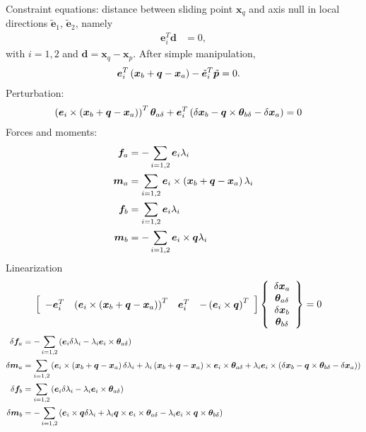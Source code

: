 \documentclass[10pt,fleqn,subeqn]{report}
\newcommand{\T}[1]{\bm{#1}}
\begin{document}
Constraint equations:
distance between sliding point $\T{x}_q$ and axis null in local directions
$\tilde{\T{e}}_1$, $\tilde{\T{e}}_2$, namely
\begin{align}
	\T{e}_i^T \T{d}
	&=
	0
	,
\end{align}
with $i=1,2$ and $\T{d} = \T{x}_q - \T{x}_p$.
After simple manipulation,
\begin{align}
	\T{e}_i^T \plbr{\T{x}_b + \T{q} - \T{x}_a} - \tilde{\T{e}}_i^T \tilde{\T{p}}
	&=
	0
	.
\end{align}
Perturbation:
\begin{align}
	\plbr{\T{e}_i \times \plbr{\T{x}_b + \T{q} - \T{x}_a}}^T \T{\theta}_{a\delta}
	+ \T{e}_i^T \plbr{
		\delta\T{x}_b
		-
		\T{q} \times \T{\theta}_{b\delta}
		-
		\delta\T{x}_a
	}
	&=
	0
\end{align}
Forces and moments:
\begin{subequations}
\begin{align}
	\T{f}_a
	&=
	- \sum_{i=1,2} \T{e}_i \lambda_i
	\\
	\T{m}_a
	&=
	\sum_{i=1,2} \T{e}_i \times \plbr{\T{x}_b + \T{q} - \T{x}_a} \lambda_i
	\\
	\T{f}_b
	&=
	\sum_{i=1,2} \T{e}_i \lambda_i
	\\
	\T{m}_b
	&=
	- \sum_{i=1,2} \T{e}_i \times \T{q} \lambda_i
\end{align}
\end{subequations}
Linearization
\begin{align}
	\sqbr{\matr{cccc}{
		-\T{e}_i^T
		&
		\plbr{\T{e}_i \times \plbr{\T{x}_b + \T{q} - \T{x}_a}}^T
		&
		\T{e}_i^T
		&
		-\plbr{\T{e}_i \times \T{q}}^T
	}} \cubr{\cvvect{
		\delta\T{x}_a
		\\
		\T{\theta}_{a\delta}
		\\
		\delta\T{x}_b
		\\
		\T{\theta}_{b\delta}
	}}
	&=
	0
\end{align}
\begin{subequations}
\begin{align}
	\delta\T{f}_a
	&=
	-\sum_{i=1,2} \plbr{
		\T{e}_i \delta\lambda_i
		-
		\lambda_i \T{e}_i \times \T{\theta}_{a\delta}
	}
	\\
	\delta\T{m}_a
	&=
	\sum_{i=1,2} \plbr{
		\T{e}_i \times \plbr{\T{x}_b + \T{q} - \T{x}_a} \delta\lambda_i
		+
		\lambda_i \plbr{\T{x}_b + \T{q} - \T{x}_a} \times \T{e}_i \times \T{\theta}_{a\delta}
		+
		\lambda_i \T{e}_i \times \plbr{
			\delta\T{x}_b
			-
			\T{q} \times \T{\theta}_{b\delta}
			-
			\delta\T{x}_a
		}
	}
	\\
	\delta\T{f}_b
	&=
	\sum_{i=1,2} \plbr{
		\T{e}_i \delta\lambda_i
		-
		\lambda_i \T{e}_i \times \T{\theta}_{a\delta}
	}
	\\
	\delta\T{m}_b
	&=
	- \sum_{i=1,2} \plbr{
		\T{e}_i \times \T{q} \delta\lambda_i
		+
		\lambda_i \T{q} \times \T{e}_i \times \T{\theta}_{a\delta}
		-
		\lambda_i \T{e}_i \times \T{q} \times \T{\theta}_{b\delta}
	}
\end{align}
\end{subequations}
\end{document}

